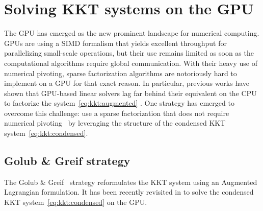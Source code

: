 \section{Solving KKT systems on the GPU}
The GPU has emerged as the new prominent landscape
for numerical computing. GPUs are using a SIMD formalism
that yields excellent throughput for parallelizing small-scale
operations, but their use remains limited as soon as the computational
algorithms require global communication. With their heavy use of numerical
pivoting, sparse factorization algorithms are notoriously hard to implement
on a GPU for that exact reason. In particular, previous works have
shown that GPU-based linear solvers lag far behind their equivalent
on the CPU to factorize the system~\eqref{eq:kkt:augmented}
\cite{tasseff2019exploring,swirydowicz2021linear}. One strategy
has emerged to overcome this challenge:
use a sparse factorization that does not require numerical pivoting~\cite{regev2023hykkt,shin2023accelerating}
by leveraging the structure of the condensed KKT system~\eqref{eq:kkt:condensed}.

\subsection{Golub \& Greif strategy}
\label{sec:kkt:golubgreif}
The Golub \& Greif~\cite{golub2003solving} strategy reformulates the KKT system
using an Augmented Lagrangian formulation.
It has been recently revisited in \cite{regev2023hykkt}
to solve the condensed KKT system~\eqref{eq:kkt:condensed} on the GPU.

